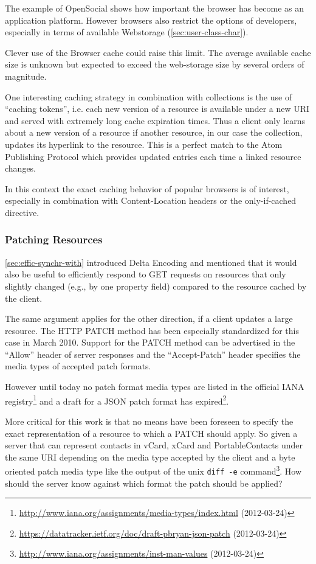 \documentclass[11pt,a4paper,headsepline,twoside]{scrartcl}		%
\newcommand{\citeurl}[2]{\url{#1} (#2)}
\begin{document}
The example of OpenSocial shows how important the browser has become as an
application platform. However browsers also restrict the options of developers,
especially in terms of available Webstorage (\autoref{sec:user-class-char}).

Clever use of the Browser cache could raise this limit. The average available
cache size is unknown but expected to exceed the web-storage size by several
orders of magnitude.

One interesting caching strategy in combination with collections is the use of
``caching tokens'', i.e. each new version of a resource is available under a new
URI and served with extremely long cache expiration times. Thus a client only
learns about a new version of a resource if another resource, in our case the
collection, updates its hyperlink to the resource. This is a perfect match to
the Atom Publishing Protocol which provides updated entries each time a linked
resource changes.

In this context the exact caching behavior of popular browsers is of interest,
especially in combination with Content-Location headers or the only-if-cached
directive.

\subsubsection{Patching Resources}
\label{sec:patching-resources}

\autoref{sec:effic-synchr-with} introduced Delta Encoding \cite{RFC3229} and
mentioned that it would also be useful to efficiently respond to GET requests on
resources that only slightly changed (e.g., by one property field) compared to
the resource cached by the client.

The same argument applies for the other direction, if a client updates a large
resource. The HTTP PATCH method \cite{RFC5789} has been especially standardized
for this case in March 2010. Support for the PATCH method can be advertised in
the ``Allow'' header of server responses and the ``Accept-Patch'' header
specifies the media types of accepted patch formats.

However until today no patch format media types are listed in the official IANA
registry\footnote{\citeurl{http://www.iana.org/assignments/media-types/index.html}{2012-03-24}}
and a draft for a JSON patch format has
expired\footnote{\citeurl{https://datatracker.ietf.org/doc/draft-pbryan-json-patch}{2012-03-24}}.

More critical for this work is that no means have been foreseen to specify the
exact representation of a resource to which a PATCH should apply. So given a
server that can represent contacts in vCard, xCard and PortableContacts under
the same URI depending on the media type accepted by the client and a byte
oriented patch media type like the output of the unix \lstinline:diff -e:
command\footnote{\citeurl{http://www.iana.org/assignments/inst-man-values}{2012-03-24}}. How
should the server know against which format the patch should be applied?
\end{document}
